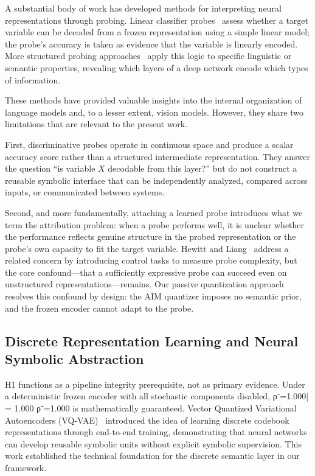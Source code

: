 \documentclass{article}
\begin{document}
A substantial body of work has developed methods for interpreting
neural representations through probing.
Linear classifier probes~\cite{alain2017probing} assess whether a
target variable can be decoded from a frozen representation using a
simple linear model; the probe's accuracy is taken as evidence that
the variable is linearly encoded.
More structured probing approaches~\cite{tenney2019bert} apply this
logic to specific linguistic or semantic properties, revealing which
layers of a deep network encode which types of information.

These methods have provided valuable insights into the internal
organization of language models and, to a lesser extent, vision
models.
However, they share two limitations that are relevant to the present
work.

First, discriminative probes operate in continuous space and produce
a scalar accuracy score rather than a structured intermediate
representation.
They answer the question ``is variable $X$ decodable from this
layer?'' but do not construct a reusable symbolic interface that can
be independently analyzed, compared across inputs, or communicated
between systems.

Second, and more fundamentally, attaching a learned probe introduces
what we term the attribution problem: when a probe performs well, it
is unclear whether the performance reflects genuine structure in the
probed representation or the probe's own capacity to fit the target
variable.
Hewitt and Liang~\cite{hewitt2019structural} address a related
concern by introducing control tasks to measure probe complexity, but
the core confound---that a sufficiently expressive probe can succeed
even on unstructured representations---remains.
Our passive quantization approach resolves this confound by design:
the AIM quantizer imposes no semantic prior, and the frozen encoder
cannot adapt to the probe.

\subsection{Discrete Representation Learning and Neural Symbolic
Abstraction}
H1 functions as a pipeline integrity prerequisite, not as primary evidence. Under a deterministic frozen encoder with all stochastic components disabled, ρˉ=1.000\bar{\rho} = 1.000
ρˉ​=1.000 is mathematically guaranteed.
Vector Quantized Variational Autoencoders
(VQ-VAE)~\cite{vandenoord2017vqvae} introduced the idea of learning
discrete codebook representations through end-to-end training,
demonstrating that neural networks can develop reusable symbolic units
without explicit symbolic supervision.
This work established the technical foundation for the discrete
semantic layer in our framework.
\end{document}
